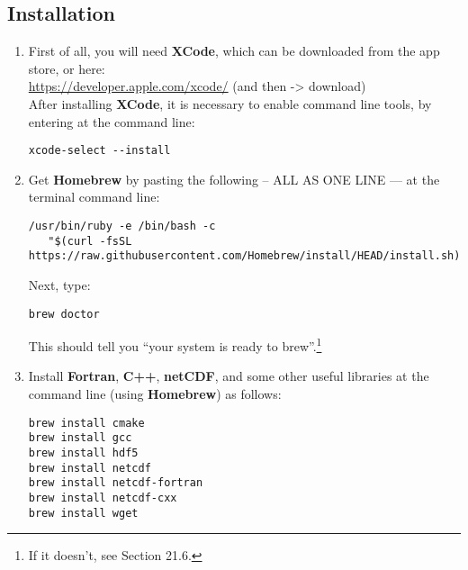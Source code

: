 \documentclass[10pt,twoside]{article}
\begin{document}
\subsection{Installation}

\begin{enumerate}[noitemsep]

\vspace{1mm}
\item First of all, you will need \textbf{XCode}, which can be downloaded from the app store, or here:
\vspace{1mm}
\\\href{https://developer.apple.com/xcode/}{https://developer.apple.com/xcode/} (and then \textsf{-> download})
\vspace{1mm}
\\After installing \textbf{XCode}, it is necessary to enable command line tools, by entering at the command line:
\vspace{-2pt}
\begin{verbatim}
xcode-select --install
\end{verbatim}
\vspace{-2pt}

\vspace{1mm}
\item Get \textbf{Homebrew} by pasting the following -- ALL AS ONE LINE --- at the terminal command line:
\vspace{-2pt}
\begin{verbatim}
/usr/bin/ruby -e /bin/bash -c 
   "$(curl -fsSL https://raw.githubusercontent.com/Homebrew/install/HEAD/install.sh)"
\end{verbatim}
\vspace{-2pt}

Next, type:
\vspace{-2pt}
\begin{verbatim}
brew doctor
\end{verbatim}
\vspace{-2pt}
This should tell you “your system is ready to brew”.\footnote{If it doesn’t, see Section 21.6.} 

\vspace{1mm}
\item Install \textbf{Fortran}, \textbf{C++}, \textbf{netCDF}, and some other useful libraries at the command line (using \textbf{Homebrew}) as follows:
\vspace{-2pt}
\begin{verbatim}
brew install cmake
brew install gcc
brew install hdf5
brew install netcdf
brew install netcdf-fortran
brew install netcdf-cxx
brew install wget
\end{verbatim}
\vspace{-2pt}


\end{enumerate}
\end{document}
